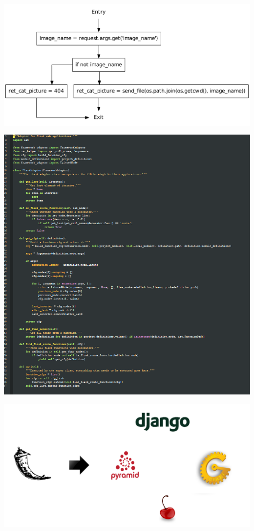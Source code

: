 \begin{frame}[plain]
  \center
  \includegraphics[height=0.6\textheight]{graphics/cfg_path_traversal}
\end{frame}


\begin{frame}[plain]
  \center
  \includegraphics[height=\textheight]{graphics/flask_adaptor_code.png}
\end{frame}


\begin{frame}
  \center
  \includegraphics[width=\textwidth]{graphics/adaptor}
\end{frame}
